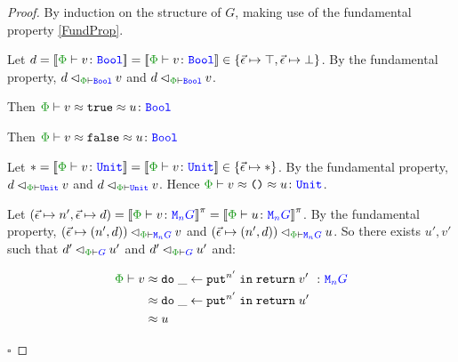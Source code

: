 \documentclass{Report}
\newcommand\eLogRel[4]{\logRel{#2}{\wellformed{#1}{#3}}{#4}}
\newcommand\peLogRel[3]{\eLogRel{\P}{#1}{#2}{#3}}
\newcommand{\zptyperelation}[2]{\typerelation{\P}{#1}{#2}}
\newcommand{\zpberelation}[2]{\berelation{\P}{#1}{#2}}
\newcommand\liftp[0]{^\pi}
\begin{document}
\begin{proof}
    By induction on the structure of $G$, making use of the fundamental property \ref{FundProp}.

    Let $d=\deno{\zptyperelation{v}{\B}}=\deno{\zptyperelation{v}{\B}}\in \{\ev\mapsto \top, \ev\mapsto\bot\}$. By the fundamental property, $\peLogRel{d}{\B}{v}$  and $\peLogRel{d}{\B}{v}$.

    Then $\zpberelation{v\beequiv\t}{u}{\B}$

    
    Then $\zpberelation{v\beequiv\f}{u}{\B}$

    Let $\singleton=\deno{\zptyperelation{v}{\U}}=\deno{\zptyperelation{v}{\U}}\in \{\ev\mapsto\singleton\}$. By the fundamental property, $\peLogRel{d}{\U}{v}$  and $\peLogRel{d}{\U}{v}$. Hence $\zpberelation{v\beequiv\u}{u}{\U}$.

    \case{\teffect}

    Let $(\ev\mapsto n', \ev\mapsto d) = \deno{\zptyperelation{v}{\M{n}{G}}}\liftp = \deno{\zptyperelation{u}{\M{n}{G}}}\liftp$. By the fundamental property, $\peLogRel{(\ev\mapsto(n', d))}{\M{n}{G}}{v}$ and $\peLogRel{(\ev\mapsto(n', d))}{\M{n}{G}}{u}$. So there exists $u', v'$ such that $\peLogRel{d'}{G}{u'}$ and $\peLogRel{d'}{G}{u'}$ and:

    \begin{align*}
        \zpberelation{v&}{\doin{\_}{\put^{n'}}{\return{v'}}}{\M{n}{G}}\\
        &\beequiv \doin{\_}{\put^{n'}}{\return{u'}}\\
        & \beequiv u
    \end{align*}

$\square$
\end{proof}
\end{document}

